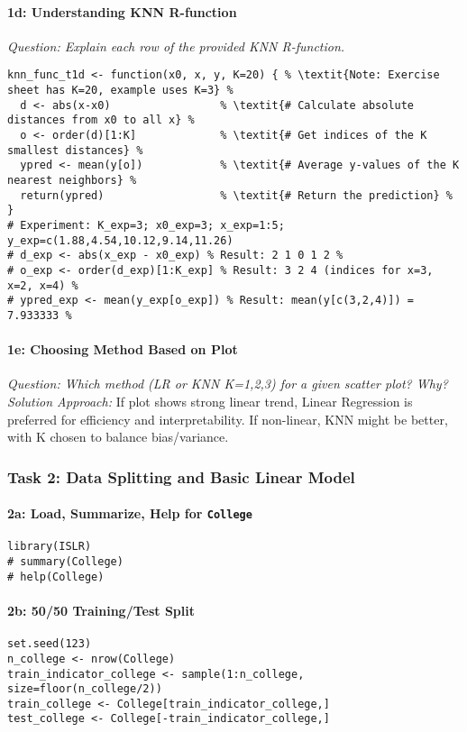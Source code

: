 \documentclass[12pt,a4paper]{article}
\newcommand{\Robject}[1]{\texttt{#1}} %
\begin{document}
            \paragraph{1d: Understanding KNN R-function}
                \textit{Question: Explain each row of the provided KNN R-function.}
\begin{lstlisting}[caption={KNN R-function (Ex Set 1, T1d)}]
knn_func_t1d <- function(x0, x, y, K=20) { % \textit{Note: Exercise sheet has K=20, example uses K=3} %
  d <- abs(x-x0)                 % \textit{# Calculate absolute distances from x0 to all x} %
  o <- order(d)[1:K]             % \textit{# Get indices of the K smallest distances} %
  ypred <- mean(y[o])            % \textit{# Average y-values of the K nearest neighbors} %
  return(ypred)                  % \textit{# Return the prediction} %
}
# Experiment: K_exp=3; x0_exp=3; x_exp=1:5; y_exp=c(1.88,4.54,10.12,9.14,11.26)
# d_exp <- abs(x_exp - x0_exp) % Result: 2 1 0 1 2 %
# o_exp <- order(d_exp)[1:K_exp] % Result: 3 2 4 (indices for x=3, x=2, x=4) %
# ypred_exp <- mean(y_exp[o_exp]) % Result: mean(y[c(3,2,4)]) = 7.933333 %
\end{lstlisting}
            \paragraph{1e: Choosing Method Based on Plot}
                \textit{Question: Which method (LR or KNN K=1,2,3) for a given scatter plot? Why?}
                \textit{Solution Approach:} If plot shows strong linear trend, Linear Regression is preferred for efficiency and interpretability. If non-linear, KNN might be better, with K chosen to balance bias/variance.

        \subsubsection{Task 2: Data Splitting and Basic Linear Model}
            \paragraph{2a: Load, Summarize, Help for \Robject{College}}
\begin{lstlisting}
library(ISLR)
# summary(College)
# help(College)
\end{lstlisting}
            \paragraph{2b: 50/50 Training/Test Split}
\begin{lstlisting}
set.seed(123)
n_college <- nrow(College)
train_indicator_college <- sample(1:n_college, size=floor(n_college/2))
train_college <- College[train_indicator_college,]
test_college <- College[-train_indicator_college,]
\end{lstlisting}
\end{document}
